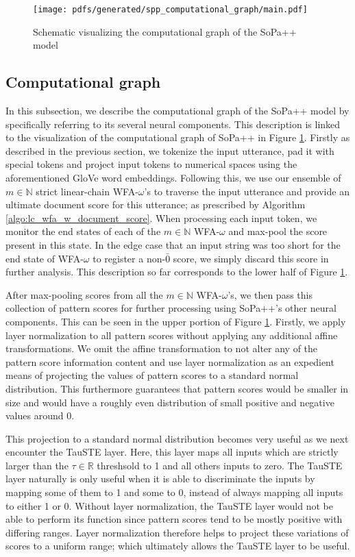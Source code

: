 \begin{figure}[t!]
  \centering
  \texttt{[image: pdfs/generated/spp\_computational\_graph/main.pdf]}
  \caption{Schematic visualizing the computational graph of the SoPa++ model}
  \label{fig:spp_cg}
\end{figure}

\subsection{Computational graph}

In this subsection, we describe the computational graph of the SoPa++ model by
specifically referring to its several neural components. This description is
linked to the visualization of the computational graph of SoPa++ in Figure
\ref{fig:spp_cg}. Firstly as described in the previous section, we tokenize the
input utterance, pad it with special tokens and project input tokens to
numerical spaces using the aforementioned GloVe word embeddings. Following this,
we use our ensemble of $m \in \mathbb{N}$ strict linear-chain WFA-$\omega$'s to
traverse the input utterance and provide an ultimate document score for this
utterance; as prescribed by Algorithm \ref{algo:lc_wfa_w_document_score}. When
processing each input token, we monitor the end states of each of the $m \in
\mathbb{N}$ WFA-$\omega$ and max-pool the score present in this state. In the
edge case that an input string was too short for the end state of WFA-$\omega$
to register a non-$\bar{0}$ score, we simply discard this score in further
analysis. This description so far corresponds to the lower half of Figure
\ref{fig:spp_cg}.

After max-pooling scores from all the $m \in \mathbb{N}$ WFA-$\omega$'s, we
then pass this collection of pattern scores for further processing using SoPa++'s other
neural components. This can be seen in the upper portion of Figure
\ref{fig:spp_cg}. Firstly, we apply layer normalization \citep{ba2016layer} to
all pattern scores without applying any additional affine
transformations. We omit the affine transformation to not alter any of the
pattern score information content and use layer normalization as an expedient
means of projecting the values of pattern scores to a standard normal
distribution. This furthermore guarantees that pattern scores would be
smaller in size and would have a roughly even distribution of small positive and
negative values around 0.

This projection to a standard normal distribution becomes very useful as we next
encounter the TauSTE layer. Here, this layer maps all inputs which are strictly
larger than the $\tau \in \mathbb{R}$ threshsold to 1 and all others inputs to
zero. The TauSTE layer naturally is only useful when it is able to discriminate
the inputs by mapping some of them to 1 and some to 0, instead of always mapping
all inputs to either 1 or 0. Without layer normalization, the TauSTE layer would
not be able to perform its function since pattern scores tend to be mostly
positive with differing ranges. Layer normalization therefore helps to project
these variations of scores to a uniform range; which ultimately allows the
TauSTE layer to be useful.

